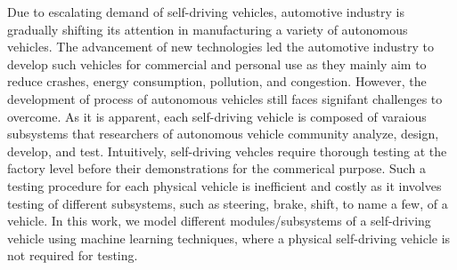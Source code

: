 \documentclass[conference]{IEEEtran}
\begin{document}
Due to escalating demand of self-driving vehicles, automotive industry is gradually shifting its attention in  manufacturing a variety of autonomous vehicles. The advancement of new technologies led the automotive industry to develop such vehicles for commercial and personal use as they mainly aim to reduce crashes, energy consumption, pollution, and congestion. However, the development of process of autonomous vehicles still faces signifant challenges to overcome. As it is apparent, each self-driving vehicle is composed of varaious subsystems that researchers of autonomous vehicle community analyze, design, develop, and test.  Intuitively, self-driving vehcles require thorough testing at the factory level before their demonstrations for  the commerical purpose. Such a testing procedure for each physical vehicle is inefficient and costly as it involves testing of different subsystems, such as steering, brake, shift, to name a few, of a vehicle. In this work, we model different modules/subsystems of a self-driving vehicle using machine learning techniques, where a physical self-driving vehicle is not required for testing.
\end{document}
